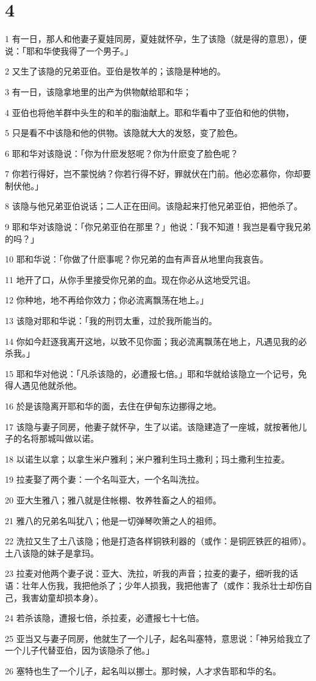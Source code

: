 \chapter{4}

\par 1 有一日，那人和他妻子夏娃同房，夏娃就怀孕，生了该隐（就是得的意思），便说：「耶和华使我得了一个男子。」
\par 2 又生了该隐的兄弟亚伯。亚伯是牧羊的；该隐是种地的。
\par 3 有一日，该隐拿地里的出产为供物献给耶和华；
\par 4 亚伯也将他羊群中头生的和羊的脂油献上。耶和华看中了亚伯和他的供物，
\par 5 只是看不中该隐和他的供物。该隐就大大的发怒，变了脸色。
\par 6 耶和华对该隐说：「你为什麽发怒呢？你为什麽变了脸色呢？
\par 7 你若行得好，岂不蒙悦纳？你若行得不好，罪就伏在门前。他必恋慕你，你却要制伏他。」
\par 8 该隐与他兄弟亚伯说话；二人正在田间。该隐起来打他兄弟亚伯，把他杀了。
\par 9 耶和华对该隐说：「你兄弟亚伯在那里？」他说：「我不知道！我岂是看守我兄弟的吗？」
\par 10 耶和华说：「你做了什麽事呢？你兄弟的血有声音从地里向我哀告。
\par 11 地开了口，从你手里接受你兄弟的血。现在你必从这地受咒诅。
\par 12 你种地，地不再给你效力；你必流离飘荡在地上。」
\par 13 该隐对耶和华说：「我的刑罚太重，过於我所能当的。
\par 14 你如今赶逐我离开这地，以致不见你面；我必流离飘荡在地上，凡遇见我的必杀我。」
\par 15 耶和华对他说：「凡杀该隐的，必遭报七倍。」耶和华就给该隐立一个记号，免得人遇见他就杀他。
\par 16 於是该隐离开耶和华的面，去住在伊甸东边挪得之地。
\par 17 该隐与妻子同房，他妻子就怀孕，生了以诺。该隐建造了一座城，就按著他儿子的名将那城叫做以诺。
\par 18 以诺生以拿；以拿生米户雅利；米户雅利生玛土撒利；玛土撒利生拉麦。
\par 19 拉麦娶了两个妻：一个名叫亚大，一个名叫洗拉。
\par 20 亚大生雅八；雅八就是住帐棚、牧养牲畜之人的祖师。
\par 21 雅八的兄弟名叫犹八；他是一切弹琴吹箫之人的祖师。
\par 22 洗拉又生了土八该隐；他是打造各样铜铁利器的（或作：是铜匠铁匠的祖师）。土八该隐的妹子是拿玛。
\par 23 拉麦对他两个妻子说：亚大、洗拉，听我的声音；拉麦的妻子，细听我的话语：壮年人伤我，我把他杀了；少年人损我，我把他害了（或作：我杀壮士却伤自己，我害幼童却损本身）。
\par 24 若杀该隐，遭报七倍，杀拉麦，必遭报七十七倍。
\par 25 亚当又与妻子同房，他就生了一个儿子，起名叫塞特，意思说：「神另给我立了一个儿子代替亚伯，因为该隐杀了他。」
\par 26 塞特也生了一个儿子，起名叫以挪士。那时候，人才求告耶和华的名。

